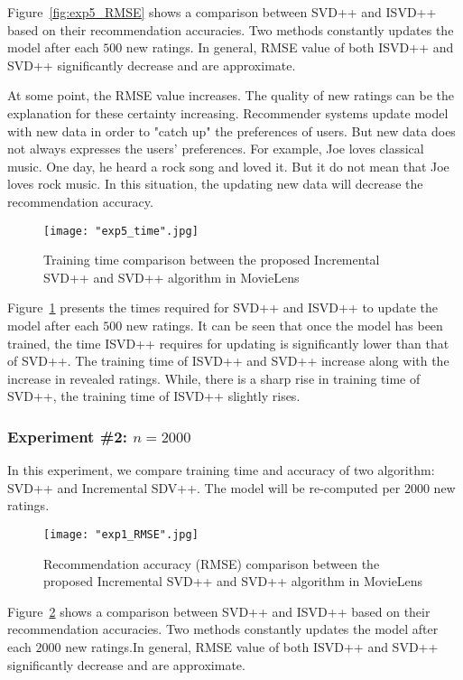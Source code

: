 \documentclass[oneside,13pt]{extreport}
\begin{document}
Figure~\ref{fig:exp5_RMSE} shows a comparison between SVD++ and ISVD++ based on their recommendation accuracies. Two methods constantly updates the model after each $500$ new ratings. In general, RMSE value of both ISVD++ and SVD++ significantly decrease and are approximate. 

At some point, the RMSE value increases. The quality of new ratings can be the explanation for these certainty increasing. Recommender systems update model with new data in order to "catch up" the preferences of users. But new data does not always expresses the users' preferences. For example, Joe loves classical music. One day, he heard a rock song and loved it. But it do not mean that Joe loves rock music. In this situation, the updating new data will decrease the recommendation accuracy. 

\begin{figure}[h!]
    \centering
    \texttt{[image: "exp5\_time".jpg]} 
    \caption{ Training time comparison between the proposed Incremental SVD++ and SVD++ algorithm in MovieLens}
    \label{fig:exp5_time}
\end{figure}

Figure~\ref{fig:exp5_time} presents the times required for SVD++ and ISVD++ to update the model after each $500$ new ratings. It can be seen that once the model has been trained, the time ISVD++ requires for updating is significantly lower than that of SVD++. The training time of ISVD++ and SVD++ increase along with the increase in revealed ratings. While, there is a sharp rise in training time of SVD++, the training time of ISVD++ slightly rises.

\clearpage
\subsubsection{Experiment \#2: $n=2000$}
In this experiment, we compare training time and accuracy of two algorithm: SVD++ and Incremental SDV++. The model will be re-computed per $2000$ new ratings.

\begin{figure}[h!]
    \centering
    \texttt{[image: "exp1\_RMSE".jpg]} 
    \caption{ Recommendation accuracy (RMSE) comparison between the proposed Incremental SVD++ and SVD++ algorithm in MovieLens}
    \label{fig:exp1_RMSE}
\end{figure}

Figure~\ref{fig:exp1_RMSE} shows a comparison between SVD++ and ISVD++ based on their recommendation accuracies. Two methods constantly updates the model after each $2000$ new ratings.In general, RMSE value of both ISVD++ and SVD++ significantly decrease and are approximate. 
\end{document}
